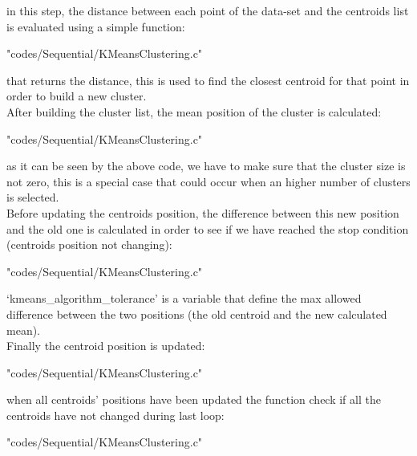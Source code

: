 \documentclass[10pt,twocolumn,letterpaper]{article}
\begin{document}
in this step, the distance between each point of the data-set and the centroids list is evaluated using a simple function:\\
\begin{lstinputlisting}[language=C,style=CSnippetStyle,caption=Distance Calculation,firstline=9,lastline=19 ]{
	"codes/Sequential/KMeansClustering.c"}
\end{lstinputlisting}
that returns the distance, this is used to find the closest centroid for that point in order to build a new cluster.\\
After building the cluster list, the mean position of the cluster is calculated:\\
\begin{lstinputlisting}[language=C,style=CSnippetStyle,caption=Distance Calculation,firstline=81,lastline=99 ]{
	"codes/Sequential/KMeansClustering.c"}
\end{lstinputlisting}
as it can be seen by the above code, we have to make sure that the cluster size is not zero, this is a special case that could occur
when an higher number of clusters is selected.\\
Before updating the centroids position, the difference between this new position and the old one is calculated in order to see if we 
have reached the stop condition (centroids position not changing):\\
\begin{lstinputlisting}[language=C,style=CSnippetStyle,caption=Distance Calculation,firstline=100,lastline=108 ]{
	"codes/Sequential/KMeansClustering.c"}
\end{lstinputlisting}
`kmeans\_algorithm\_tolerance' is a variable that define the max allowed difference between the two positions (the old centroid and the
new calculated mean).\\
Finally the centroid position is updated:\\
\begin{lstinputlisting}[language=C,style=CSnippetStyle,caption=Distance Calculation,firstline=109,lastline=109]{
	"codes/Sequential/KMeansClustering.c"}
\end{lstinputlisting}
when all centroids' positions have been updated the function check if all the centroids have not changed during last loop:\\
\begin{lstinputlisting}[language=C,style=CSnippetStyle,caption=Distance Calculation,firstline=111,lastline=113]{
	"codes/Sequential/KMeansClustering.c"}
\end{lstinputlisting}
\end{document}
